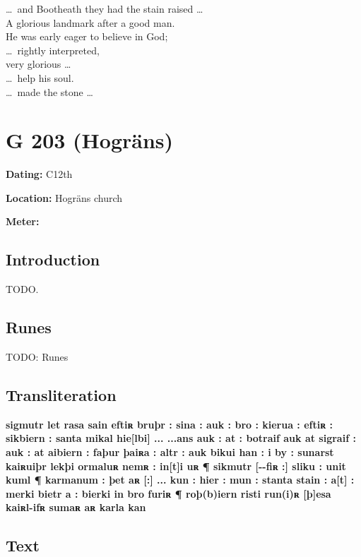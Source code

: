 \bpb \dots\ and Bootheath they had the stain raised \dots \\
A glorious landmark after a good man. \\
He was early eager to believe in God; \\
\dots\ rightly interpreted, \\
very glorious \dots \\
\dots\ help his soul. \\
\dots\ made the stone \dots\epb\epg

\sectionline\clearpage


\section{G 203 (Hogräns)}

\begin{flushright}%
\textbf{Dating:} C12th

\textbf{Location:} Hogräns church

\textbf{Meter:} \Fornyrdislag
\end{flushright}%

\subsection{Introduction}

TODO.

\subsection{Runes}

TODO: Runes%

\subsection{Transliteration}

\textbf{sigmutr let rasa sain eftiʀ bruþr : sina : auk : bro : kierua : eftiʀ : sikbiern : santa mikal hie[lbi] ... ...ans auk : at : botraif auk at sigraif : auk : at aibiern : faþur þaiʀa : altr : auk bikui han : i by : sunarst kaiʀuiþr lekþi ormaluʀ nemʀ : in[t]i uʀ
¶ sikmutr [{}-{}-fiʀ :] sliku : unit kuml
¶ karmanum : þet aʀ [:] ... kun : hier : mun : stanta stain : a[t] : merki bietr a : bierki in bro furiʀ
¶ roþ(b)iern risti run(i)ʀ [þ]esa kaiʀl-ifʀ sumaʀ aʀ karla kan}

\subsection{Text}

